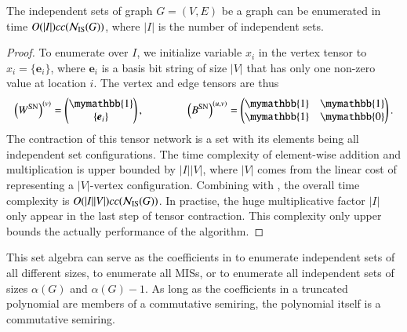 \documentclass[review, onefignum, onetabnum]{siamart190516}
\begin{document}
\begin{theorem}\label{thm:complexset}
    The independent sets of graph $G = (V, E)$ be a graph can be enumerated in time $O(|I|)cc({\mathcal{N}_{\rm IS}(G)})$, where $|I|$ is the number of independent sets.
\end{theorem}
\begin{proof}
To enumerate over $I$,  we initialize variable $x_{i}$ in the vertex tensor to $x_i = \{\boldsymbol{e}_{i}\}$, where $\boldsymbol{e}_i$ is a basis bit string of size $|V|$ that has only one non-zero value at location $i$.
The vertex and edge tensors are thus
\begin{equation}
    \left(W^{\rm SN}\right)^{(v)} = \left(\begin{matrix}
        \mymathbb{1} \\
        \{\boldsymbol{e}_{i}\}
    \end{matrix}\right),   
    \qquad \qquad
        \left(B^{\rm SN}\right)^{(u, v)} = \left(\begin{matrix}
        \mymathbb{1}  & \mymathbb{1} \\
        \mymathbb{1} & \mymathbb{0}
    \end{matrix}\right).
\end{equation}
The contraction of this tensor network is a set with its elements being all independent set configurations. The time complexity of element-wise addition and multiplication is upper bounded by $|I||V|$, where $|V|$ comes from the linear cost of representing a $|V|$-vertex configuration. Combining with , the overall time complexity is $O(|I||V|)cc({\mathcal{N}_{\rm IS}(G)})$.
In practise, the huge multiplicative factor $|I|$ only appear in the last step of tensor contraction.
This complexity only upper bounds the actually performance of the algorithm.
\end{proof}

This set algebra can serve as the coefficients in  to enumerate independent sets of all different sizes,  to enumerate all MISs, or  to enumerate all independent sets of sizes $\alpha(G)$ and $\alpha(G)-1$.
As long as the coefficients in a truncated polynomial are members of a commutative semiring, the polynomial itself is a commutative semiring.
\end{document}
